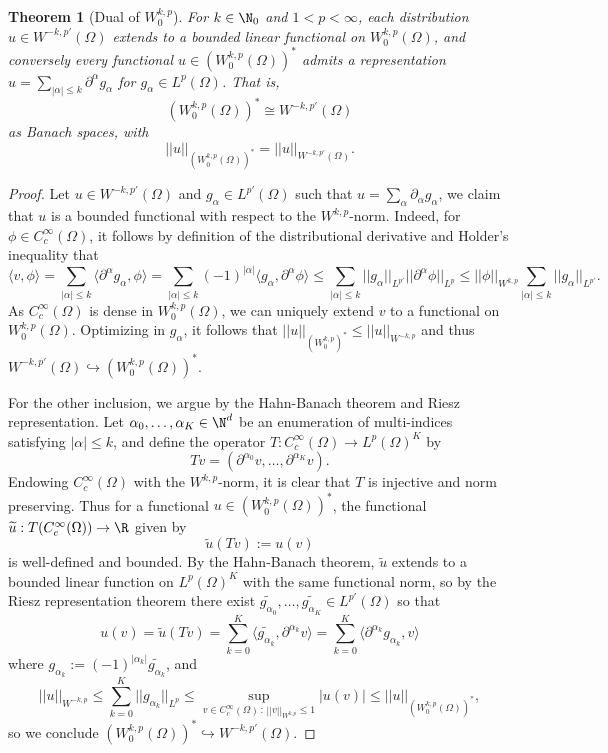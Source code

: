 \documentclass[reqno]{amsart}
\newtheorem{theorem}{Theorem}
\theoremstyle{definition}
\theoremstyle{remark}
\begin{document}
\begin{theorem}[Dual of $W^{k, p}_0$]
	For $k \in \N_0$ and $1 < p < \infty$, each distribution $u \in W^{-k, p'} (\Omega)$ extends to a bounded linear functional on $W^{k, p}_0 (\Omega)$, and conversely every functional $u \in (W^{k, p}_0 (\Omega))^*$ admits a representation $u =  \sum_{|\alpha| \leq k} \partial^\alpha g_\alpha$ for $g_\alpha \in L^p (\Omega)$. 
That is, 
		\[ (W^{k, p}_0 (\Omega))^* \cong W^{-k, p'} (\Omega) \]
	as Banach spaces, with
		\[ ||u||_{(W^{k, p}_0 (\Omega))^*} = ||u||_{W^{-k, p'} (\Omega)}. \]	
\end{theorem}

\begin{proof}
	Let $u \in W^{-k, p'} (\Omega)$ and $g_\alpha \in L^{p'} (\Omega)$ such that $u = \sum_\alpha \partial_\alpha g_\alpha$, we claim that $u$ is a bounded functional with respect to the $W^{k, p}$-norm. Indeed, for $\phi \in C^\infty_c (\Omega)$, it follows by definition of the distributional derivative and Holder's inequality that	
		\[ \langle v, \phi \rangle = \sum_{|\alpha| \leq k} \langle \partial^\alpha g_\alpha, \phi \rangle = \sum_{|\alpha| \leq k} (-1)^{|\alpha|}  \langle g_\alpha, \partial^\alpha \phi \rangle \leq \sum_{|\alpha| \leq k} ||g_\alpha||_{L^{p'}} ||\partial^\alpha \phi||_{L^p} \leq ||\phi||_{W^{k, p}} \sum_{|\alpha| \leq k} ||g_\alpha||_{L^{p'}}.\]
	As $C^\infty_c (\Omega)$ is dense in $W^{k, p}_0 (\Omega)$, we can uniquely extend $v$ to a functional on	 $W^{k, p}_0 (\Omega)$. Optimizing in $g_\alpha$, it follows that $||u||_{(W^{k, p}_0)^*} \leq || u||_{W^{-k, p}}$ and thus $W^{-k, p'} (\Omega) \hookrightarrow (W^{k, p}_0 (\Omega))^*$.
		
	For the other inclusion, we argue by the Hahn-Banach theorem and Riesz representation. Let $\alpha_0, \dots, \alpha_K \in \N^d$ be an enumeration of multi-indices satisfying $|\alpha| \leq k$,  and define the operator $T: C^\infty_c (\Omega) \to L^p (\Omega)^K$ by 
		\[ Tv = (\partial^{\alpha_0} v, \dots, \partial^{\alpha_K} v). \]
	Endowing $C^\infty_c (\Omega)$ with the $W^{k, p}$-norm, it is clear that $T$ is injective and norm preserving. Thus for a functional $u \in (W^{k, p}_0 (\Omega))^*$, the functional $\widetilde u : T(C^\infty_c (\Omega)) \to \R$ given by 
		\[ \widetilde u(Tv) := u(v) \]
	is well-defined and bounded. By the Hahn-Banach theorem, $\widetilde u$ extends to a bounded linear function on $L^p (\Omega)^K$ with the same functional norm, so by the Riesz representation theorem there exist $\widetilde{g_{\alpha_0}}, \dots, \widetilde{g_{\alpha_K}} \in L^{p'} (\Omega)$ so that  
		\[ u(v) = \widetilde u (Tv) = \sum_{k = 0}^K \langle \widetilde{g_{\alpha_k}}, \partial^{\alpha_k} v \rangle = \sum_{k = 0}^K \langle \partial^{\alpha_k} g_{\alpha_k}, v \rangle  \]
	where $g_{\alpha_k} := (-1)^{|\alpha_k|} \widetilde{g_{\alpha_k}}$, and 
		\[ ||u||_{W^{-k, p}} \leq \sum_{k = 0}^K ||g_{\alpha_k}||_{L^p} \leq \sup_{v \in C^\infty_c (\Omega) \, : \, ||v||_{W^{k, p}} \leq 1} |u (v)| \leq ||u||_{(W^{k, p}_0 (\Omega))^*}, \]
	so we conclude 	$(W^{k, p}_0 (\Omega))^* \hookrightarrow W^{-k, p'} (\Omega)$. 
\end{proof}
\end{document}
